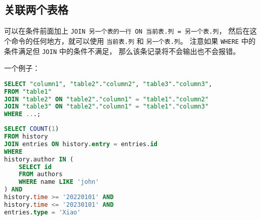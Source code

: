 \subsection{关联两个表格}
可以在条件前面加上 \verb|JOIN 另一个表的一行 ON 当前表.列 = 另一个表.列|， 然后在这个命令的任何地方，就可以使用 \verb|当前表.列| 和 \verb|另一个表.列|。 注意如果 \verb|WHERE| 中的条件满足但 \verb|JOIN| 中的条件不满足， 那么该条记录将不会输出也不会报错。

一个例子：
\begin{lstlisting}[language=sql]
SELECT "column1", "table2"."column2", "table3"."column3",
FROM "table1"
JOIN "table2" ON "table2"."column1" = "table1"."column2"
JOIN "table3" ON "table2"."column1" = "table1"."column3"
WHERE ...;
\end{lstlisting}

\begin{lstlisting}[language=sql,caption=stat.sh]
SELECT COUNT(1) 
FROM history 
JOIN entries ON history.entry = entries.id 
WHERE 
history.author IN ( 
    SELECT id 
    FROM authors 
    WHERE name LIKE 'john' 
) AND 
history.time >= '20220101' AND 
history.time <= '20230101' AND 
entries.type = 'Xiao'
\end{lstlisting}
